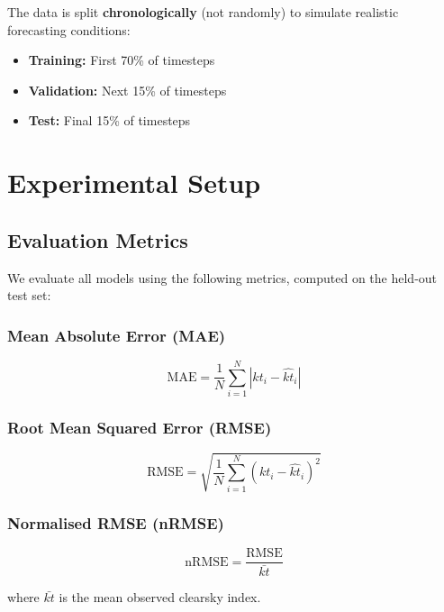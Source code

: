\documentclass[11pt,a4paper]{article}
\begin{document}
The data is split \textbf{chronologically} (not randomly) to simulate realistic forecasting conditions:
\begin{itemize}[noitemsep]
    \item \textbf{Training:} First 70\% of timesteps
    \item \textbf{Validation:} Next 15\% of timesteps
    \item \textbf{Test:} Final 15\% of timesteps
\end{itemize}

\section{Experimental Setup}
\label{sec:experimental}

\subsection{Evaluation Metrics}

We evaluate all models using the following metrics, computed on the held-out test set:

\subsubsection{Mean Absolute Error (MAE)}
\begin{equation}
    \text{MAE} = \frac{1}{N} \sum_{i=1}^{N} |kt_i - \hat{kt}_i|
\end{equation}

\subsubsection{Root Mean Squared Error (RMSE)}
\begin{equation}
    \text{RMSE} = \sqrt{\frac{1}{N} \sum_{i=1}^{N} (kt_i - \hat{kt}_i)^2}
\end{equation}

\subsubsection{Normalised RMSE (nRMSE)}
\begin{equation}
    \text{nRMSE} = \frac{\text{RMSE}}{\bar{kt}}
\end{equation}

where $\bar{kt}$ is the mean observed clearsky index.
\end{document}
